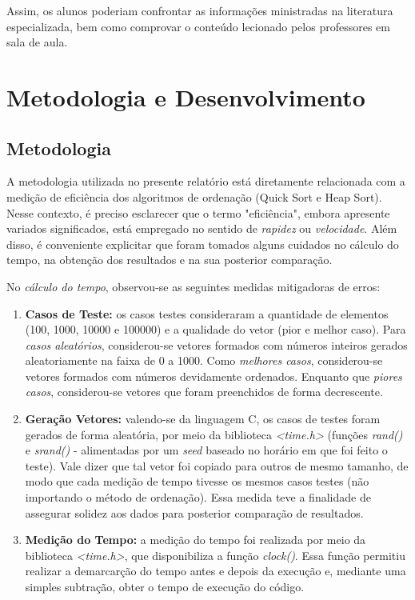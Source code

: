 \documentclass[a4paper, 12pt]{article}
\begin{document}
Assim, os alunos poderiam confrontar as informações ministradas na literatura especializada, bem como comprovar o conteúdo lecionado pelos professores em sala de aula.

\section{Metodologia e Desenvolvimento}

\subsection{Metodologia}
\tab{ }A metodologia utilizada no presente relatório está diretamente relacionada com a medição de eficiência dos algoritmos de ordenação (Quick Sort e Heap Sort). Nesse contexto, é preciso esclarecer que o termo "eficiência", embora apresente variados significados, está empregado no sentido de \textit{rapidez} ou \textit{velocidade}. Além disso, é conveniente explicitar que foram tomados alguns cuidados no cálculo do tempo, na obtenção dos resultados e na sua posterior comparação. 

No \textit{cálculo do tempo}, observou-se as seguintes medidas mitigadoras de erros:
\begin{enumerate}
    \item \textbf{Casos de Teste:} os casos testes consideraram a quantidade de elementos (100, 1000, 10000 e 100000) e a qualidade do vetor (pior e melhor caso). Para \textit{casos aleatórios}, considerou-se vetores formados com números inteiros gerados aleatoriamente na faixa de 0 a 1000. Como \textit{melhores casos}, considerou-se vetores formados com números devidamente ordenados. Enquanto que \textit{piores casos}, considerou-se vetores que foram preenchidos de forma decrescente.
    \item \textbf{Geração Vetores:} valendo-se da linguagem C, os casos de testes foram gerados de forma aleatória, por meio da biblioteca \textit{<time.h>} (funções \textit{rand()} e \textit{srand()} - alimentadas por um \textit{seed} baseado no horário em que foi feito o teste). Vale dizer que tal vetor foi copiado para outros de mesmo tamanho, de modo que cada medição de tempo tivesse os mesmos casos testes (não importando o método de ordenação). Essa medida teve a finalidade de assegurar solidez aos dados para posterior comparação de resultados.
    \item \textbf{Medição do Tempo:} a medição do tempo foi realizada por meio da biblioteca \textit{<time.h>}, que disponibiliza a função \textit{clock()}. Essa função permitiu realizar a demarcarção do tempo antes e depois da execução e, mediante uma simples subtração, obter o tempo de execução do código.
\end{enumerate}
\end{document}
